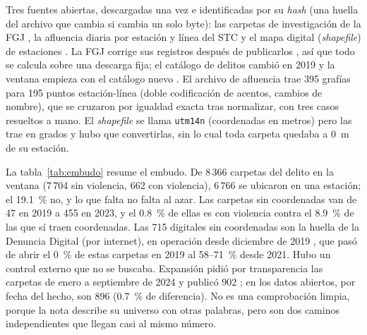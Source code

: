 \documentclass[conference]{IEEEtran}
\begin{document}
Tres fuentes abiertas, descargadas una vez e identificadas por su \emph{hash} (una huella del archivo que cambia si cambia un solo byte): las carpetas de investigación de la FGJ \cite{fgj_carpetas}, la afluencia diaria por estación y línea del STC \cite{stc_afluencia} y el mapa digital (\emph{shapefile}) de estaciones \cite{stc_shapefile}. La FGJ corrige sus registros después de publicarlos \cite{fgj_nota_retro}, así que todo se calcula sobre una descarga fija; el catálogo de delitos cambió en 2019 y la ventana empieza con el catálogo nuevo \cite{fgj_nota_reclas}. El archivo de afluencia trae 395 grafías para 195 puntos estación-línea (doble codificación de acentos, cambios de nombre), que se cruzaron por igualdad exacta tras normalizar, con tres casos resueltos a mano. El \emph{shapefile} se llama \texttt{utm14n} (coordenadas en metros) pero las trae en grados y hubo que convertirlas, sin lo cual toda carpeta quedaba a 0~m de su estación.

La tabla~\ref{tab:embudo} resume el embudo. De 8\,366 carpetas del delito en la ventana (7\,704 sin violencia, 662 con violencia), 6\,766 se ubicaron en una estación; el 19.1~\% no, y lo que falta no falta al azar. Las carpetas sin coordenadas van de 47 en 2019 a 455 en 2023, y el 0.8~\% de ellas es con violencia contra el 8.9~\% de las que sí traen coordenadas. Las 715 digitales sin coordenadas son la huella de la Denuncia Digital (por internet), en operación desde diciembre de 2019 \cite{adip_denuncia_digital}, que pasó de abrir el 0~\% de estas carpetas en 2019 al 58--71~\% desde 2021. Hubo un control externo que no se buscaba. Expansión pidió por transparencia las carpetas de enero a septiembre de 2024 y publicó 902 \cite{expansion2024}; en los datos abiertos, por fecha del hecho, son 896 (0.7~\% de diferencia). No es una comprobación limpia, porque la nota describe su universo con otras palabras, pero son dos caminos independientes que llegan casi al mismo número.
\end{document}
